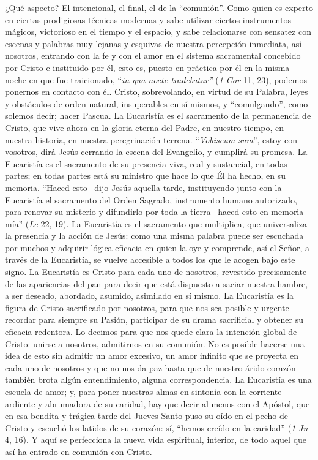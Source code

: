 			\begin{body}¿Qué aspecto? El intencional, el final, el de la “comunión”. Como quien es experto en ciertas prodigiosas técnicas modernas y sabe utilizar ciertos instrumentos mágicos, victorioso en el tiempo y el espacio, y sabe relacionarse con sensatez con escenas y palabras muy lejanas y esquivas de nuestra percepción inmediata, así nosotros, entrando con la fe y con el amor en el sistema sacramental concebido por Cristo e instituido por él, esto es, puesto en práctica por él en la misma noche en que fue traicionado, “\textit{in qua nocte tradebatur”} (\textit{1 Cor} 11, 23), podemos ponernos en contacto con él. Cristo, sobrevolando, en virtud de su Palabra, leyes y obstáculos de orden natural, insuperables en sí mismos, y “comulgando”, como solemos decir; hacer Pascua. La Eucaristía es el sacramento de la permanencia de Cristo, que vive ahora en la gloria eterna del Padre, en nuestro tiempo, en nuestra historia, en nuestra peregrinación terrena. “\textit{Vobiscum sum}”, estoy con vosotros, dirá Jesús cerrando la escena del Evangelio, y cumplirá su promesa. La Eucaristía es el sacramento de su presencia viva, real y sustancial, en todas partes; en todas partes está su ministro que hace lo que Él ha hecho, en su memoria. “Haced esto –dijo Jesús aquella tarde, instituyendo junto con la Eucaristía el sacramento del Orden Sagrado, instrumento humano autorizado, para renovar su misterio y difundirlo por toda la tierra– haced esto en memoria mía” (\textit{Lc} 22, 19). La Eucaristía es el sacramento que multiplica, que universaliza la presencia y la acción de Jesús: como una misma palabra puede ser escuchada por muchos y adquirir lógica eficacia en quien la oye y comprende, así el Señor, a través de la Eucaristía, se vuelve accesible a todos los que le acogen bajo este signo. La Eucaristía es Cristo para cada uno de nosotros, revestido precisamente de las apariencias del pan para decir que está dispuesto a saciar nuestra hambre, a ser deseado, abordado, asumido, asimilado en sí mismo. La Eucaristía es la figura de Cristo sacrificado por nosotros, para que nos sea posible y urgente recordar para siempre su Pasión, participar de su drama sacrificial y obtener su eficacia redentora. Lo decimos para que nos quede clara la intención global de Cristo: unirse a nosotros, admitirnos en su comunión. No es posible hacerse una idea de esto sin admitir un amor excesivo, un amor infinito que se proyecta en cada uno de nosotros y que no nos da paz hasta que de nuestro árido corazón también brota algún entendimiento, alguna correspondencia. La Eucaristía es una escuela de amor; y, para poner nuestras almas en sintonía con la corriente ardiente y abrumadora de su caridad, hay que decir al menos con el Apóstol, que en esa bendita y trágica tarde del Jueves Santo puso su oído en el pecho de Cristo y escuchó los latidos de su corazón: sí, “hemos creído en la caridad” (\textit{1 Jn} 4, 16). Y aquí se perfecciona la nueva vida espiritual, interior, de todo aquel que así ha entrado en comunión con Cristo. \end{body}
			
